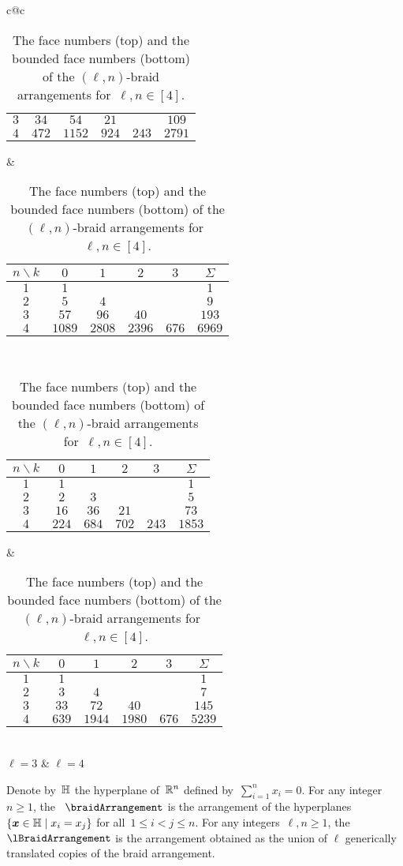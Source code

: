 \begin{table}
{\begin{tabular}{c@{\hspace{.7cm}}c}
\begin{tabular}[t]{c|cccc|c}
			$3$ & $34$ & $54$ & $21$ && $109$ \\
			$4$ & $472$ & $1152$ & $924$ & $243$ & $2791$
		\end{tabular}
		&
		\begin{tabular}[t]{c|cccc|c}
			$n \backslash k$ & $0$ & $1$ & $2$ & $3$ & $\Sigma$ \\
			\hline
			$1$ & $1$ &&&& $1$ \\
			$2$ & $5$ & $4$ &&& $9$ \\
			$3$ & $57$ & $96$ & $40$ && $193$ \\
			$4$ & $1089$ & $2808$ & $2396$ & $676$ & $6969$
		\end{tabular}
		\\[2cm]
		\begin{tabular}[t]{c|cccc|c}
			$n \backslash k$ & $0$ & $1$ & $2$ & $3$ & $\Sigma$ \\
			\hline
			$1$ & $1$ &&&& $1$ \\
			$2$ & $2$ & $3$ &&& $5$ \\
			$3$ & $16$ & $36$ & $21$ && $73$ \\
			$4$ & $224$ & $684$ & $702$ & $243$ & $1853$
		\end{tabular}
		&
		\begin{tabular}[t]{c|cccc|c}
			$n \backslash k$ & $0$ & $1$ & $2$ & $3$ & $\Sigma$ \\
			\hline
			$1$ & $1$ &&&& $1$ \\
			$2$ & $3$ & $4$ &&& $7$ \\
			$3$ & $33$ & $72$ & $40$ && $145$ \\
			$4$ & $639$ & $1944$ & $1980$ & $676$ & $5239$
		\end{tabular}
		\\[2cm]
		$\ell = 3$ & $\ell = 4$
	\end{tabular}
	}
	\vspace{.3cm}
	\caption{The face numbers (top) and the bounded face numbers (bottom) of the $(\ell,n)$-braid arrangements for~$\ell, n \in [4]$.}
	\label{table:fvectorlBraidArrangements}
\end{table}

\begin{definition}
Denote by~$\mathbb{H}$ the hyperplane of~$\mathbb R^n$ defined by~$\sum_{i = 1}^n x_i = 0$.
For any integer~$n \geq 1$, the ~$\braidArrangement$ is the arrangement of the hyperplanes~$\left\{ \boldsymbol{x} \in \mathbb{H} \;\middle|\; x_i = x_j \right\}$ for all~$1 \le i < j \le n$.
For any integers~$\ell,n \geq 1$, the ~$\lBraidArrangement$ is the arrangement obtained as the union of $\ell$ generically translated copies of the braid arrangement.
\end{definition}

